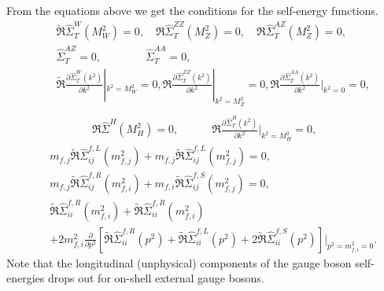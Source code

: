 From the equations above we get the conditions for the self-energy functions.
\begin{eqnarray}
&&\widetilde{\Re}\hat{\Sigma}^W_{T}(M^2_W)=0,\quad \Re\hat{\Sigma}^{ZZ}_{T}(M^2_Z)=0,\quad \Re\hat{\Sigma}^{AZ}_{T}(M^2_Z)=0,\nonumber\\
&&\hat{\Sigma}^{AZ}_T=0, \qquad\qquad \hat{\Sigma}^{AA}_T=0,\nonumber\\ 
&&\widetilde{\Re}\frac{\partial \hat{\Sigma}^W_T(k^2)}{\partial k^2}|_{k^2=M^2_W}=0,
\Re\frac{\partial \hat{\Sigma}^{ZZ}_T(k^2)}{\partial k^2}|_{k^2=M^2_Z}=0,
\Re\frac{\partial \hat{\Sigma}^{AA}_T(k^2)}{\partial k^2}|_{k^2=0}=0,\nonumber\\
\end{eqnarray}
\begin{eqnarray}
\Re\hat{\Sigma}^H(M^2_H)=0, \quad\qquad \Re\frac{\partial \hat{\Sigma}^{H}_T(k^2)}{\partial k^2}|_{k^2=M^2_H}=0,
\end{eqnarray}
\begin{eqnarray}
&& m_{f,j}\widetilde{\Re}\hat{\Sigma}^{f,L}_{ij}(m^2_{f,j})+m_{f,j}\widetilde{\Re}\hat{\Sigma}^{f,L}_{ij}(m^2_{f,j})=0,\nonumber\\
&& m_{f,j}\widetilde{\Re}\hat{\Sigma}^{f,R}_{ij}(m^2_{f,i})+m_{f,i}\widetilde{\Re}\hat{\Sigma}^{f,S}_{ij}(m^2_{f,j})=0,\nonumber\\
&&\widetilde{\Re}\hat{\Sigma}^{f,R}_{ii}(m^2_{f,i})+\widetilde{\Re}\hat{\Sigma}^{f,R}_{ii}(m^2_{f,i})\nonumber\\
&&+2m^2_{f,i}\frac{\partial}{\partial p^2}[\widetilde{\Re}\hat{\Sigma}^{f,R}_{ii}(p^2)+\widetilde{\Re}\hat{\Sigma}^{f,L}_{ii}(p^2)+2\widetilde{\Re}\hat{\Sigma}^{f,S}_{ii}(p^2)]|_{p^2=m_{f,i}^2=0}.
\end{eqnarray}
Note that the longitudinal (unphysical) components of the gauge boson self-energies drops out for on-shell external gauge bosons.

